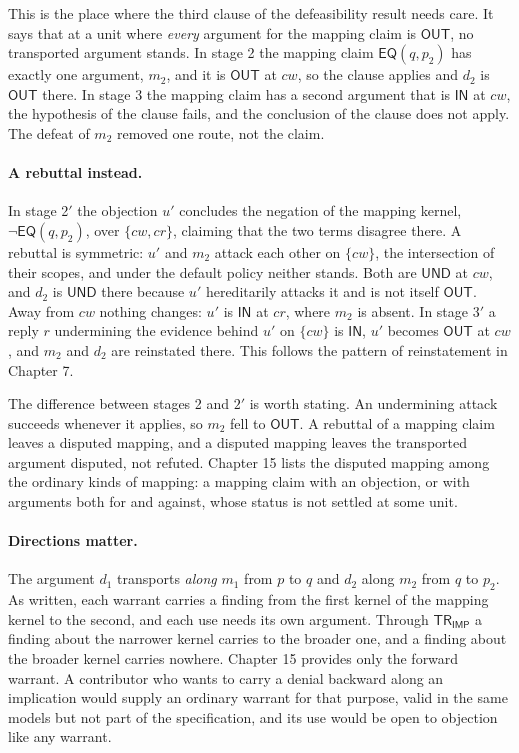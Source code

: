 \documentclass[11pt]{article}
\newcommand{\IN}{\textsf{IN}}
\newcommand{\UND}{\textsf{UND}}
\newcommand{\OUT}{\textsf{OUT}}
\newcommand{\EQ}{\mathsf{EQ}}
\newcommand{\IMP}{\mathsf{IMP}}
\newcommand{\TR}{\mathsf{TR}}
\newcommand{\nk}[1]{\neg#1}
\begin{document}
This is the place where the third clause of the defeasibility result needs care. It says that at a unit where \emph{every} argument for the mapping claim is $\OUT$, no transported argument stands. In stage 2 the mapping claim $\EQ(q,p_2)$ has exactly one argument, $m_2$, and it is $\OUT$ at $cw$, so the clause applies and $d_2$ is $\OUT$ there. In stage 3 the mapping claim has a second argument that is $\IN$ at $cw$, the hypothesis of the clause fails, and the conclusion of the clause does not apply. The defeat of $m_2$ removed one route, not the claim.

\paragraph{A rebuttal instead.} In stage 2$'$ the objection $u'$ concludes the negation of the mapping kernel, $\nk{\EQ(q,p_2)}$, over $\{cw,cr\}$, claiming that the two terms disagree there. A rebuttal is symmetric: $u'$ and $m_2$ attack each other on $\{cw\}$, the intersection of their scopes, and under the default policy neither stands. Both are $\UND$ at $cw$, and $d_2$ is $\UND$ there because $u'$ hereditarily attacks it and is not itself $\OUT$. Away from $cw$ nothing changes: $u'$ is $\IN$ at $cr$, where $m_2$ is absent. In stage $3'$ a reply $r$ undermining the evidence behind $u'$ on $\{cw\}$ is $\IN$, $u'$ becomes $\OUT$ at $cw$, and $m_2$ and $d_2$ are reinstated there. This follows the pattern of reinstatement in Chapter 7.

The difference between stages 2 and $2'$ is worth stating. An undermining attack succeeds whenever it applies, so $m_2$ fell to $\OUT$. A rebuttal of a mapping claim leaves a disputed mapping, and a disputed mapping leaves the transported argument disputed, not refuted. Chapter 15 lists the disputed mapping among the ordinary kinds of mapping: a mapping claim with an objection, or with arguments both for and against, whose status is not settled at some unit.

\paragraph{Directions matter.} The argument $d_1$ transports \emph{along} $m_1$ from $p$ to $q$ and $d_2$ along $m_2$ from $q$ to $p_2$. As written, each warrant carries a finding from the first kernel of the mapping kernel to the second, and each use needs its own argument. Through $\TR_{\IMP}$ a finding about the narrower kernel carries to the broader one, and a finding about the broader kernel carries nowhere. Chapter 15 provides only the forward warrant. A contributor who wants to carry a denial backward along an implication would supply an ordinary warrant for that purpose, valid in the same models but not part of the specification, and its use would be open to objection like any warrant.
\end{document}
